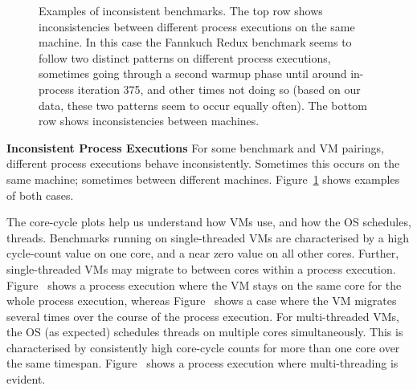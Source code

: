 \documentclass[preprint,numbers,10pt]{sigplanconf}
\begin{document}
\begin{figure}[t!]
\makebox[\textwidth][c]{~}  %
\caption{Examples of inconsistent benchmarks.
The top row shows inconsistencies between different process
executions on the same machine. In this case the Fannkuch Redux benchmark
seems to follow two distinct patterns on different process executions,
sometimes going through a second warmup phase until around in-process iteration 375, and
other times not doing so (based on our data, these two patterns seem to occur
equally often). The bottom row shows inconsistencies between
machines.}
\label{fig:examples:inconsistent}
\end{figure}

\textbf{Inconsistent Process Executions} \label{sub:inconsistent}
For some benchmark and VM pairings, different process executions behave
inconsistently. Sometimes this occurs on the same machine; sometimes between
different machines.
Figure~\ref{fig:examples:inconsistent} shows examples of both cases.


The core-cycle plots help us understand how VMs use, and how the OS schedules,
threads. Benchmarks running on single-threaded VMs are characterised by a high
cycle-count value on one core, and a near zero value on all other cores.
Further, single-threaded VMs may migrate to between cores within a process
execution. Figure~ shows a process execution where the VM stays on the
same core for the whole process execution, whereas Figure~ shows a
case where the VM migrates several times over the course of the process
execution. For multi-threaded VMs, the OS (as expected) schedules threads on
multiple cores simultaneously. This is characterised by consistently high
core-cycle counts for more than one core over the same timespan.
Figure~ shows a process execution where multi-threading is evident.
\end{document}
